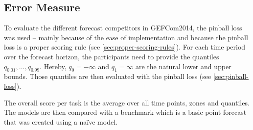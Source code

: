 \subsection{Error Measure}

To evaluate the different forecast competitors in GEFCom2014, 
the pinball loss was used -- mainly because of the ease of implementation 
and because the pinball loss is a proper scoring rule (see \ref{sec:proper-scoring-rules}).
For each time period over the forecast horizon, the participants need to 
provide the quantiles \(q_{0.01}, \ldots, q_{0.99}\). 
Hereby, \(q_0 = -\infty\) and \(q_1 = \infty\) are the natural lower and upper bounds. 
Those quantiles are then evaluated with the pinball loss (see \ref{sec:pinball-loss}).

The overall score per task is the average over all time points, zones and quantiles.
The models are then compared with a benchmark which is a basic point forecast 
that was created using a na\"{i}ve model.